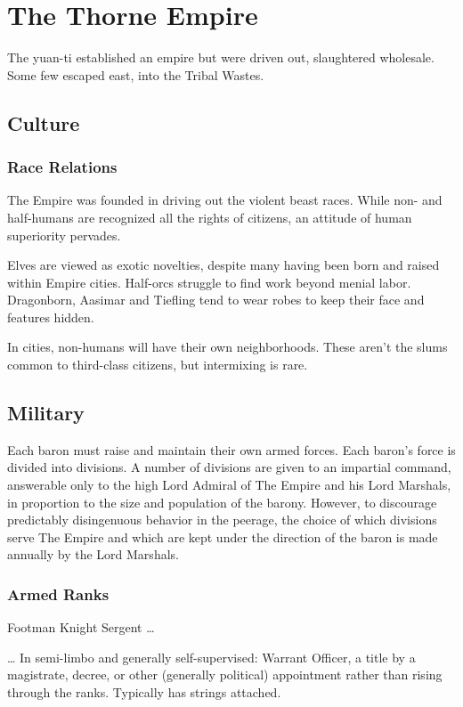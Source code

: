 \section{The Thorne Empire}

The yuan-ti established an empire but were driven out, slaughtered wholesale.
Some few escaped east, into the Tribal Wastes.

\subsection{Culture}
\subsubsection{Race Relations}
The Empire was founded in driving out the violent beast races.
While non- and half-humans are recognized all the rights of citizens, an attitude of human
 superiority pervades.

Elves are viewed as exotic novelties, despite many having been born and raised within Empire cities.
Half-orcs struggle to find work beyond menial labor.
Dragonborn, Aasimar and Tiefling tend to wear robes to keep their face and features hidden.

In cities, non-humans will have their own neighborhoods.
These aren't the slums common to third-class citizens, but intermixing is rare.

\subsection{Military}
Each baron must raise and maintain their own armed forces.
Each baron's force is divided into divisions.
A number of divisions are given to an impartial command, answerable only to the high Lord Admiral
 of The Empire and his Lord Marshals, in proportion to the size and population of the barony.
However, to discourage predictably disingenuous behavior in the peerage, the choice of which
 divisions serve The Empire and which are kept under the direction of the baron is made
 annually by the Lord Marshals.

\subsubsection{Armed Ranks}
Footman \textrightarrow
Knight \textrightarrow
Sergent \textrightarrow \ldots

\ldots \textrightarrow
In semi-limbo and generally self-supervised:
Warrant Officer, a title by a magistrate, decree, or other (generally political)
  appointment rather than rising through the ranks.
Typically has strings attached.

